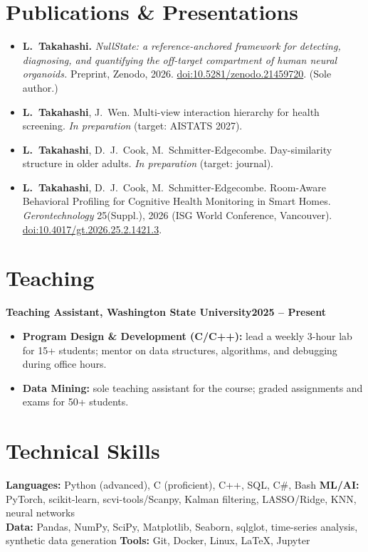 \documentclass[10pt]{article}
\newcommand{\role}[2]{\noindent\textbf{#1}\hfill\textbf{#2}\par}
\begin{document}
\section{Publications \& Presentations}
\begin{itemize}
\item \textbf{L.\ Takahashi.} \textit{NullState: a reference-anchored framework for detecting, diagnosing, and quantifying the off-target compartment of human neural organoids.} Preprint, Zenodo, 2026. \href{https://doi.org/10.5281/zenodo.21459720}{doi:10.5281/zenodo.21459720}. (Sole author.)
\item \textbf{L.\ Takahashi}, J.\ Wen. Multi-view interaction hierarchy for health screening. \textit{In preparation} (target: AISTATS 2027).
\item \textbf{L.\ Takahashi}, D.\ J.\ Cook, M.\ Schmitter-Edgecombe. Day-similarity structure in older adults. \textit{In preparation} (target: journal).
\item \textbf{L.\ Takahashi}, D.\ J.\ Cook, M.\ Schmitter-Edgecombe. Room-Aware Behavioral Profiling for Cognitive Health Monitoring in Smart Homes. \textit{Gerontechnology} 25(Suppl.), 2026 (ISG World Conference, Vancouver). \href{https://doi.org/10.4017/gt.2026.25.2.1421.3}{doi:10.4017/gt.2026.25.2.1421.3}.
\end{itemize}

\section{Teaching}
\role{Teaching Assistant, Washington State University}{2025 -- Present}
\begin{itemize}
\item \textbf{Program Design \& Development (C/C++):} lead a weekly 3-hour lab for 15+ students; mentor on data structures, algorithms, and debugging during office hours.
\item \textbf{Data Mining:} sole teaching assistant for the course; graded assignments and exams for 50+ students.
\end{itemize}

\section{Technical Skills}
\noindent\textbf{Languages:} Python (advanced), C (proficient), C++, SQL, C\#, Bash \quad\textbf{ML/AI:} PyTorch, scikit-learn, scvi-tools/Scanpy, Kalman filtering, LASSO/Ridge, KNN, neural networks \\[1pt]
\textbf{Data:} Pandas, NumPy, SciPy, Matplotlib, Seaborn, sqlglot, time-series analysis, synthetic data generation \quad\textbf{Tools:} Git, Docker, Linux, \LaTeX, Jupyter
\end{document}
